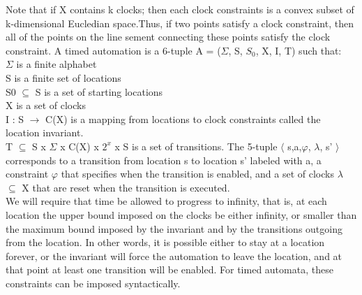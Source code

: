 Note that if X contains k clocks; then each clock constraints is a convex subset of k-dimensional Eucledian space.Thus, if two points satisfy a clock constraint, then all of the points	on the line sement connecting these points satisfy the clock constraint.
A timed automation is a 6-tuple A = ($\Sigma$, S, $S_0$, X, I, T) such that: \\
$\Sigma$ is a finite alphabet  \\
S is a finite set of locations \\
S0 $\subseteq$ S is a set of starting locations \\
X is a set of clocks \\
I : S $\rightarrow$ C(X) is a mapping from locations to clock constraints called the location invariant. \\
T $\subseteq$ S x $\Sigma$ x C(X) x $2^{x}$ x S is a set of transitions. The 5-tuple $\langle$ s,a,$\varphi$, $\lambda$, s' $\rangle$ corresponds to a transition from location s to location s' labeled with a, a constraint $\varphi$ that specifies when the transition is enabled, and a set of clocks $\lambda$ $\subseteq$ X that  are reset when the transition is executed. \\


We will require that time be allowed to progress to infinity, that is, at each location the upper bound imposed on the clocks be either infinity, or smaller than the maximum bound imposed by the invariant and by the transitions outgoing from the location. In other words, it is possible either to stay at a location forever, or the invariant will force the automation to leave the location, and at that point at least one transition will be enabled. For timed automata, these constraints can be imposed syntactically.

